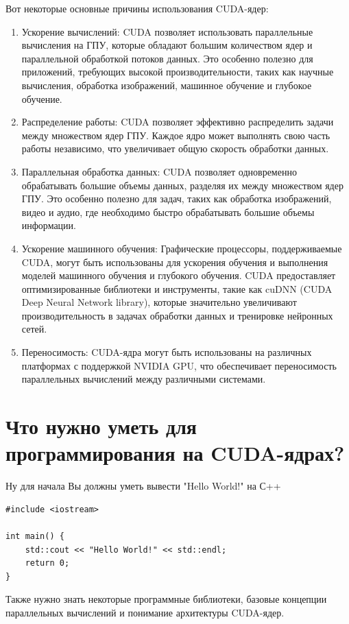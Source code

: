 \documentclass[a4paper, 12pt]{article}
\begin{document}
Вот некоторые основные причины использования CUDA-ядер:
\begin{enumerate}
    \item Ускорение вычислений: CUDA позволяет использовать параллельные вычисления на ГПУ, которые обладают большим количеством ядер и параллельной обработкой потоков данных. Это особенно полезно для приложений, требующих высокой производительности, таких как научные вычисления, обработка изображений, машинное обучение и глубокое обучение.
    \item Распределение работы: CUDA позволяет эффективно распределить задачи между множеством ядер ГПУ. Каждое ядро может выполнять свою часть работы независимо, что увеличивает общую скорость обработки данных.
    \item Параллельная обработка данных: CUDA позволяет одновременно обрабатывать большие объемы данных, разделяя их между множеством ядер ГПУ. Это особенно полезно для задач, таких как обработка изображений, видео и аудио, где необходимо быстро обрабатывать большие объемы информации.
    \item Ускорение машинного обучения: Графические процессоры, поддерживаемые CUDA, могут быть использованы для ускорения обучения и выполнения моделей машинного обучения и глубокого обучения. CUDA предоставляет оптимизированные библиотеки и инструменты, такие как cuDNN (CUDA Deep Neural Network library), которые значительно увеличивают производительность в задачах обработки данных и тренировке нейронных сетей.
    \item Переносимость: CUDA-ядра могут быть использованы на различных платформах с поддержкой NVIDIA GPU, что обеспечивает переносимость параллельных вычислений между различными системами.

\end{enumerate}

\section{Что нужно уметь для программирования на CUDA-ядрах?}
Ну для начала Вы должны уметь вывести "Hello World!" на С++

\begin{lstlisting}
#include <iostream>

int main() {
    std::cout << "Hello World!" << std::endl;
    return 0;
}
\end{lstlisting}

Также нужно знать некоторые программные библиотеки, базовые концепции параллельных вычислений и понимание архитектуры CUDA-ядер.
\end{document}
